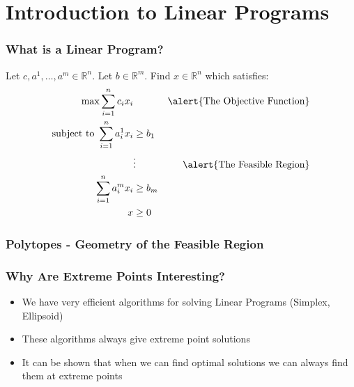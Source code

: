 \documentclass[10pt]{beamer}
\begin{document}
\section{Introduction to Linear Programs}

\begin{frame}
\frametitle{What is a Linear Program?}
Let $c, a^1, \dots, a^m \in \mathbb{R}^n$. Let $b \in \mathbb{R}^m$. Find $x \in \mathbb{R}^n$ which satisfies:
\begin{align*}
\max \sum_{i=1}^n c_i x_i&\  &\text{\alert{The Objective Function}}\\
\text{subject to } \sum_{i=1}^n a_i^1 x_i &\geq b_1\\
&\vdots &\text{\alert{The Feasible Region}}\\
\sum_{i=1}^n a_i^m x_i &\geq b_m \\
x &\geq 0
\end{align*}
\end{frame}

\begin{frame}
\frametitle{Polytopes - Geometry of the Feasible Region}
\begin{center}
\end{center}
\end{frame}

\begin{frame}
\frametitle{Why Are Extreme Points Interesting?}
\begin{itemize}
\item We have very efficient algorithms for solving Linear Programs (\alert{Simplex}, \alert{Ellipsoid})
\item These algorithms always give \alert{extreme point} solutions
\item It can be shown that when we can find \alert{optimal solutions} we can always find them at \alert{extreme points}
\end{itemize}
\end{frame}
\end{document}
